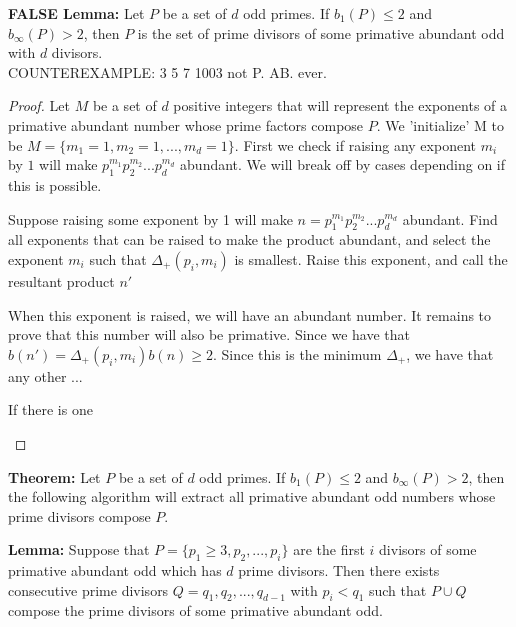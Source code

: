 \documentclass[../paper.tex]{subfiles}
\begin{document}
\textbf{FALSE Lemma:} Let $P$ be a set of $d$ odd primes. If $b_{1}(P) \leq 2$
and $b_{\infty}(P) > 2$, then $P$ is the set of prime divisors of 
some primative abundant odd with $d$ divisors.\\ COUNTEREXAMPLE:
3 5 7 1003 not P. AB. ever.

\begin{proof}

Let $M$ be a set of $d$ positive integers that will represent
the exponents of a primative abundant number whose prime factors
compose $P$. We 'initialize' M to be
%
$M = \{m_1=1, m_2=1, ..., m_d=1 \}$. 
%
First we check if raising any exponent $m_i$ by $1$ will make 
$p_1^{m_1} p_2^{m_2} ... p_d^{m_d}$ abundant. We will break off
by cases depending on if this is possible.
\begin{case}
	Suppose raising some exponent by 1 will make $n = p_1^{m_1} 
p_2^{m_2} ... p_d^{m_d}$ abundant. Find all exponents that can be
raised to make the product abundant, and select the exponent $m_i$
such that $\Delta_{+}(p_i, m_i)$ is smallest. Raise this exponent,
and call the resultant product $n'$

When this exponent is raised, we will have an abundant number. It
remains to prove that this number will also be primative. Since
we have that $b(n') = \Delta_{+}(p_i, m_i) b(n) \geq 2$. Since 
this is the minimum $\Delta_{+}$, we have that any other ...
\end{case}

\begin{case}
If there is one 
%
\end{case}
\end{proof}


\textbf{Theorem:} Let $P$ be a set of $d$ odd primes. If $b_{1}(P) \leq 2$
and $b_{\infty}(P) > 2$, then the following algorithm will extract all primative
abundant odd numbers whose prime divisors compose $P$.


\textbf{Lemma:} Suppose that $P = \{ p_1 \geq 3, p_2, ..., p_i\}$ are 
the first $i$ divisors of some primative abundant odd which has
$d$ prime divisors. Then there exists consecutive prime divisors
$Q = q_1, q_2, ..., q_{d - 1}$ with $p_i < q_1$ such that 
$P \cup Q$ compose the prime divisors of some primative abundant 
odd.
\end{document}
